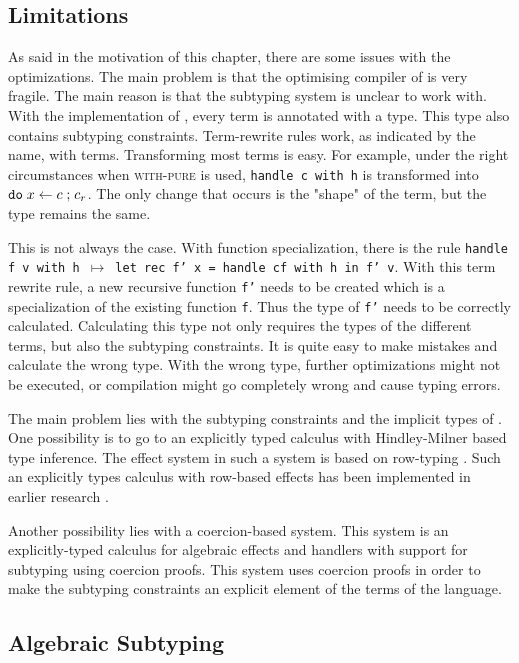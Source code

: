 \subsection{Limitations}\label{problems-eff}
As said in the motivation of this chapter, there are some issues with the optimizations. The main problem is that the optimising compiler of \eff is very fragile. The main reason is that the subtyping system is unclear to work with. With the implementation of \eff, every term is annotated with a type. This type also contains subtyping constraints. Term-rewrite rules work, as indicated by the name, with terms. Transforming most terms is easy. For example, under the right circumstances when \textsc{with-pure} is used, \texttt{handle c with h} is transformed into $\mathtt{do}\; x \leftarrow c \;\mathtt{ ; }\; c_r$. The only change that occurs is the "shape" of the term, but the type remains the same.

This is not always the case. With function specialization, there is the rule \texttt{handle f v with h $\mapsto$ let rec f' x = handle cf with h in f' v}. With this term rewrite rule, a new recursive function \texttt{f'} needs to be created which is a specialization of the existing function \texttt{f}. Thus the type of \texttt{f'} needs to be correctly calculated. Calculating this type not only requires the types of the different terms, but also the subtyping constraints. It is quite easy to make mistakes and calculate the wrong type. With the wrong type, further optimizations might not be executed, or compilation might go completely wrong and cause typing errors. 

The main problem lies with the subtyping constraints and the implicit types of \eff. One possibility is to go to an explicitly typed calculus with Hindley-Milner based type inference. The effect system in such a system is based on row-typing \cite{type-directed, row, leijen2014koka}. Such an explicitly types calculus with row-based effects has been implemented in earlier research \cite{row-optimised}.  

Another possibility lies with a coercion-based system. This system is an explicitly-typed calculus for algebraic effects and handlers with support for subtyping using coercion proofs. This system uses coercion proofs in order to make the subtyping constraints an explicit element of the terms of the language. \cite{saleh2018explicit}

\subsection{Algebraic Subtyping}

